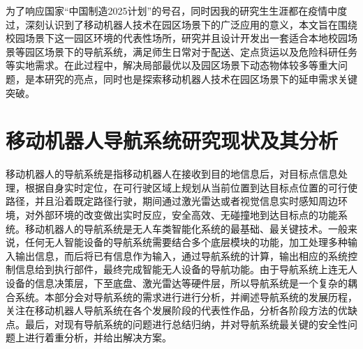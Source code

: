 为了响应国家“中国制造2025计划”的号召，同时因我的研究生生涯都在疫情中度过，深刻认识到了移动机器人技术在园区场景下的广泛应用的意义，本文旨在围绕校园场景下这一园区环境的代表性场所，研究并且设计开发出一套适合本地校园场景等园区场景下的导航系统，满足师生日常对于配送、定点货运以及危险科研任务等实地需求。在此过程中，解决局部最优以及园区场景下动态物体较多等重大问题，是本研究的亮点，同时也是探索移动机器人技术在园区场景下的延申需求关键突破。


\section{移动机器人导航系统研究现状及其分析}
移动机器人的导航系统是指移动机器人在接收到目的地信息后，对目标点信息处理，根据自身实时定位，在可行驶区域上规划从当前位置到达目标点位置的可行使路径，并且沿着既定路径行驶，期间通过激光雷达或者视觉信息实时感知周边环境，对外部环境的改变做出实时反应，安全高效、无碰撞地到达目标点的功能系统。移动机器人的导航系统是无人车类智能化系统的最基础、最关键技术。一般来说，任何无人智能设备的导航系统需要结合多个底层模块的功能，加工处理多种输入输出信息，而后将已有信息作为输入，通过导航系统的计算，输出相应的系统控制信息给到执行部件，最终完成智能无人设备的导航功能。由于导航系统上连无人设备的信息决策层，下至底盘、激光雷达等硬件层，所以导航系统是一个复杂的耦合系统。本部分会对导航系统的需求进行进行分析，并阐述导航系统的发展历程，关注在移动机器人导航系统在各个发展阶段的代表性作品，分析各阶段方法的优缺点。最后，对现有导航系统的问题进行总结归纳，并对导航系统最关键的安全性问题上进行着重分析，并给出解决方案。

